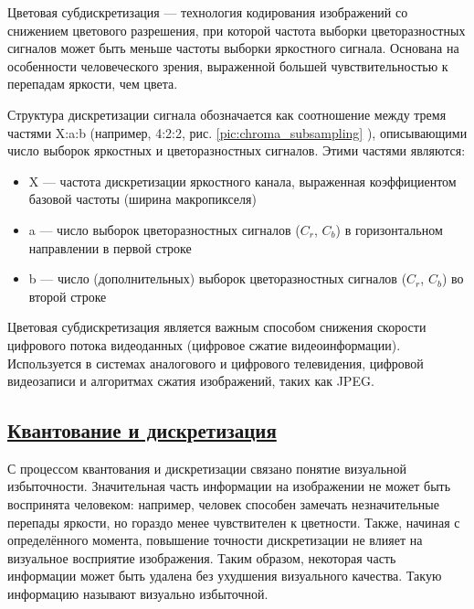Цветовая субдискретизация — технология кодирования изображений со снижением цветового разрешения, при которой частота выборки цветоразностных сигналов может быть меньше частоты выборки яркостного сигнала. Основана на особенности человеческого зрения, выраженной большей чувствительностью к перепадам яркости, чем цвета. 

Структура дискретизации сигнала обозначается как соотношение между тремя частями X:a:b (например, 4:2:2, рис. \ref{pic:chroma_subsampling} ), описывающими число выборок яркостных и цветоразностных сигналов. Этими частями являются:

\begin{itemize}
	
	\item X — частота дискретизации яркостного канала, выраженная коэффициентом базовой частоты (ширина макропикселя)
	
	\item a — число выборок цветоразностных сигналов ($C_r$, $C_b$) в горизонтальном направлении в первой строке
	
	\item b — число (дополнительных) выборок цветоразностных сигналов ($C_r$, $C_b$) во второй строке
	
\end{itemize}



Цветовая субдискретизация является важным способом снижения скорости цифрового потока видеоданных (цифровое сжатие видеоинформации). Используется в системах аналогового и цифрового телевидения, цифровой видеозаписи и алгоритмах сжатия изображений, таких как JPEG.

\subsection*{\hyperlink{toc}{Квантование и дискретизация}}

С процессом квантования и дискретизации связано понятие визуальной избыточности. Значительная часть информации на изображении не может быть воспринята человеком: например, человек способен замечать незначительные перепады яркости, но гораздо менее чувствителен к цветности. Также, начиная с определённого момента, повышение точности дискретизации не влияет на визуальное восприятие изображения. Таким образом, некоторая часть информации может быть удалена без ухудшения визуального качества. Такую информацию называют визуально избыточной.

